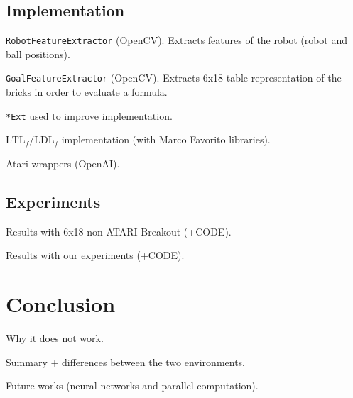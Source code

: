 \documentclass[a4paper]{article}
\begin{document}
\subsection{Implementation}
\texttt{RobotFeatureExtractor} (OpenCV). Extracts features of the robot (robot
and ball positions).


\texttt{GoalFeatureExtractor} (OpenCV). Extracts 6x18 table representation
of the bricks in order to evaluate a formula.


\texttt{*Ext} used to improve implementation.

$\text{LTL}_f/\text{LDL}_f$ implementation (with Marco Favorito libraries).


Atari wrappers (OpenAI).

\subsection{Experiments}
\label{subsec:experiments}
Results with 6x18 non-ATARI Breakout (+CODE).

Results with our experiments (+CODE).

\clearpage
\section{Conclusion}
Why it does not work.

Summary + differences between the two environments.

Future works (neural networks and parallel computation).


\clearpage







\end{document}
